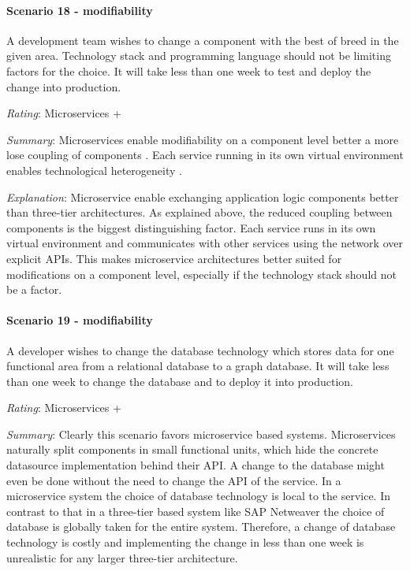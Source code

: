 \paragraph{Scenario 18 - modifiability}
A development team wishes to change a component with the best of breed in the given area. Technology stack and programming language should not be limiting factors for the choice. It will take less than one week to test and deploy the change into production.
\label{quaMicro:s18}

\textit{Rating}: Microservices +

\textit{Summary}: Microservices enable modifiability on a component level better a more lose coupling of components \citep[p. 5]{Wolff2016}.
Each service running in its own virtual environment enables technological heterogeneity \citep[p. 4]{Newman2015}.

\textit{Explanation}:
Microservice enable exchanging application logic components better than three-tier architectures.
As explained above, the reduced coupling between components is the biggest distinguishing factor.
Each service runs in its own virtual environment and communicates with other services using the network over explicit \ac{API}s.
This makes microservice architectures better suited for modifications on a component level, especially if the technology stack should not be a factor.

\paragraph{Scenario 19 - modifiability}
A developer wishes to change the database technology which stores data for one functional area from a relational database to a graph database. It will take less than one week to change the database and to deploy it into production.
\label{quaMicro:s19}

\textit{Rating}: Microservices +

\textit{Summary}: 
Clearly this scenario favors microservice based systems.
Microservices naturally split components in small functional units, which hide the concrete datasource implementation behind their \ac{API}.
A change to the database might even be done without the need to change the \ac{API} of the service.
In a microservice system the choice of database technology is local to the service.
In contrast to that in a three-tier based system like SAP Netweaver the choice of database is globally taken for the entire system.
Therefore, a change of database technology is costly and implementing the change in less than one week is unrealistic for any larger three-tier architecture.

